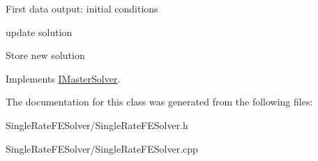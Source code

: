 First data output: initial conditions

update solution

Store new solution 

Implements \hyperlink{classIMasterSolver}{IMasterSolver}.

The documentation for this class was generated from the following files:\begin{DoxyCompactItemize}
\item 
SingleRateFESolver/SingleRateFESolver.h\item 
SingleRateFESolver/SingleRateFESolver.cpp\end{DoxyCompactItemize}
